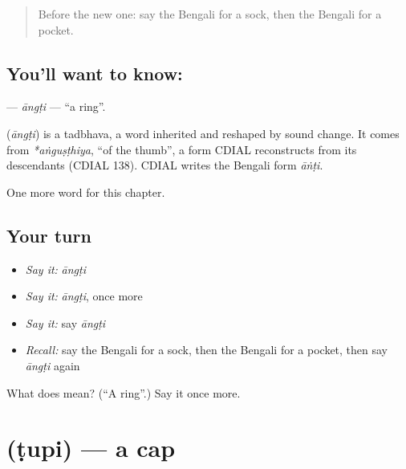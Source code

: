\label{lesson:BN-C85-angti}



\begin{quote}
Before the new one: say the Bengali for a sock, then the Bengali for a pocket.
\end{quote}

\subsection*{You'll want to know: }
\textbf{} — \emph{āngṭi} — \textquotedblleft{}a ring\textquotedblright{}.

\begin{cousinweb}
\textbf{} (\emph{āngṭi}) is a tadbhava, a word inherited and reshaped by sound change. It comes from \emph{*aṅguṣṭhiya}, \textquotedblleft{}of the thumb\textquotedblright{}, a form CDIAL reconstructs from its descendants (CDIAL 138). CDIAL writes the Bengali form \emph{āṅṭi}.
\end{cousinweb}

\begin{grammarlens}[title={What you've built}]
One more word for this chapter.
\end{grammarlens}

\subsection*{Your turn}
\begin{itemize}
\raggedright
  \item \emph{Say it:} \emph{āngṭi}
  \item \emph{Say it:} \emph{āngṭi}, once more
  \item \emph{Say it:} say \emph{āngṭi}
  \item \emph{Recall:} say the Bengali for a sock, then the Bengali for a pocket, then say \emph{āngṭi} again
\end{itemize}

\begin{tcolorbox}[breakable,colback=teal!4,colframe=teal!35!black,title={Before you move on}]
What does  mean? (\textquotedblleft{}A ring\textquotedblright{}.) Say it once more.
\end{tcolorbox}
\section[\texorpdfstring{\bn{টুপি} (ṭupi)}{টুপি (ṭupi)}]{ (ṭupi) — a cap}

